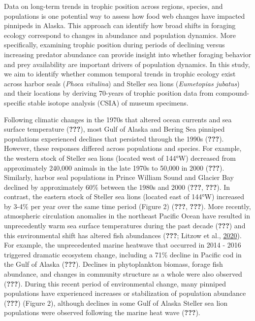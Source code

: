 \documentclass [11pt, proquest] {uwthesis}[2015/03/03]
\begin{document}
Data on long-term trends in trophic position across regions, species,
and populations is one potential way to assess how food web changes have
impacted pinnipeds in Alaska. This approach can identify how broad
shifts in foraging ecology correspond to changes in abundance and
population dynamics. More specifically, examining trophic position
during periods of declining versus increasing predator abundance can
provide insight into whether foraging behavior and prey availability are
important drivers of population dynamics. In this study, we aim to
identify whether common temporal trends in trophic ecology exist across
harbor seals (\emph{Phoca vitulina}) and Steller sea lions
(\emph{Eumetopias jubatus}) and their locations by deriving 70-years of
trophic position data from compound-specific stable isotope analysis
(CSIA) of museum specimens.

Following climatic changes in the 1970s that altered ocean currents and
sea surface temperature ({\textbf{???}}), most Gulf of Alaska and Bering
Sea pinniped populations experienced declines that persisted through the
1990s ({\textbf{???}}). However, these responses differed across
populations and species. For example, the western stock of Steller sea
lions (located west of 144°W) decreased from approximately 240,000
animals in the late 1970s to 50,000 in 2000 ({\textbf{???}}). Similarly,
harbor seal populations in Prince William Sound and Glacier Bay declined
by approximately 60\% between the 1980s and 2000 ({\textbf{???}},
{\textbf{???}}). In contrast, the eastern stock of Steller sea lions
(located east of 144°W) increased by 3-4\% per year over the same time
period (Figure 2) ({\textbf{???}}, {\textbf{???}}). More recently,
atmospheric circulation anomalies in the northeast Pacific Ocean have
resulted in unprecedently warm sea surface temperatures during the past
decade ({\textbf{???}}) and this environmental shift has altered fish
abundances ({\textbf{???}}; Litzow et al.,
\protect\hyperlink{ref-Litzow2020}{2020}). For example, the
unprecedented marine heatwave that occurred in 2014 - 2016 triggered
dramatic ecosystem change, including a 71\% decline in Pacific cod in
the Gulf of Alaska ({\textbf{???}}). Declines in phytoplankton biomass,
forage fish abundance, and changes in community structure as a whole
were also observed ({\textbf{???}}). During this recent period of
environmental change, many pinniped populations have experienced
increases or stabilization of population abundance ({\textbf{???}})
(Figure 2), although declines in some Gulf of Alaska Steller sea lion
populations were observed following the marine heat wave
({\textbf{???}}).
\end{document}
